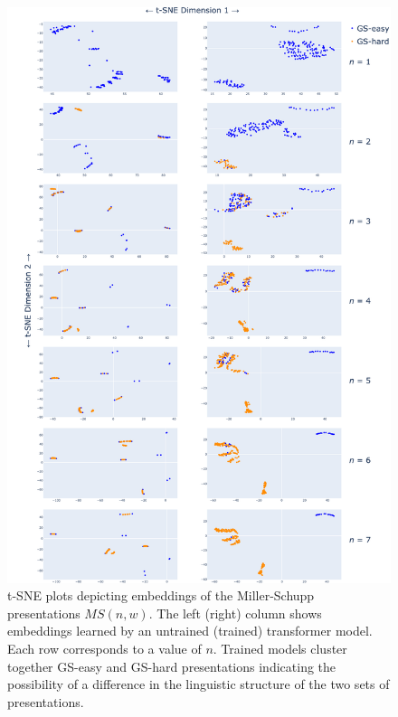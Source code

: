 \begin{figure}
    \centering
    \includegraphics[scale=0.23]{fig/embeddings.png}
    \captionsetup{width=1.1\textwidth}
    \caption{t-SNE plots depicting embeddings of the Miller-Schupp presentations $MS(n, w)$. The left (right) column shows embeddings learned by an untrained (trained) transformer model. Each row corresponds to a value of $n$. Trained models cluster together GS-easy and GS-hard presentations indicating the possibility of a difference in the linguistic structure of the two sets of presentations.}
    \label{fig:tsne_embeddings}
\end{figure}
